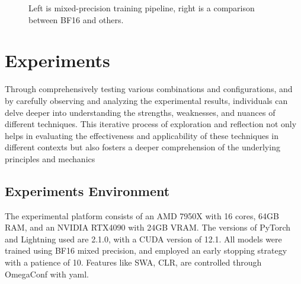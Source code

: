 \documentclass[10pt,twocolumn,letterpaper]{article}
\begin{document}
\begin{figure}[h]
	\centering
	\caption{Left is mixed-precision training pipeline\cite{micikevicius2018mixed}, right is a comparison between BF16 and others\cite{kalamkar2019study}.}
	\label{fig:amp-bf}
\end{figure}

\section{Experiments}
Through comprehensively testing various combinations and configurations, and by carefully observing and analyzing the experimental results, individuals can delve deeper into understanding the strengths, weaknesses, and nuances of different techniques. This iterative process of exploration and reflection not only helps in evaluating the effectiveness and applicability of these techniques in different contexts but also fosters a deeper comprehension of the underlying principles and mechanics
\label{sec:exper}
\subsection{Experiments Environment}
\label{exper:env}
The experimental platform consists of an AMD 7950X with 16 cores, 64GB RAM, and an NVIDIA RTX4090 with 24GB VRAM. The versions of PyTorch and Lightning used are 2.1.0, with a CUDA version of 12.1. All models were trained using BF16 mixed precision, and employed an early stopping strategy with a patience of 10.
Features like SWA, CLR, \etc are controlled through OmegaConf with yaml.
\end{document}
